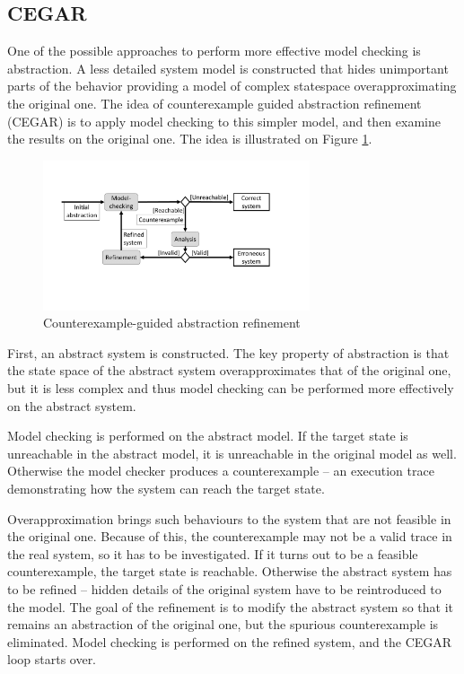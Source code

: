 \subsection{CEGAR}

One of the possible approaches to perform more effective model checking is abstraction. A less detailed system model is constructed that hides unimportant parts of the behavior providing a model of complex statespace overapproximating the original one. The idea of counterexample guided abstraction refinement (CEGAR) \cite{clarke2003counterexample} is to apply 
model checking to this simpler model, and then examine the results on the original one. The idea is illustrated on
Figure \ref{fig:cegar}.


\begin{figure}
	\centering
	\includegraphics [width=0.7\textwidth] {include/figures/cegar_flow_black}
	\caption{Counterexample-guided abstraction refinement}
	\label{fig:cegar}
\end{figure}


First, an abstract system is constructed. The key property of abstraction is
that the state space of the abstract system overapproximates that of the original
one, but it is less complex and thus model checking can be performed more effectively on the abstract system.

Model checking is performed on the abstract model. If the target state is
unreachable in the abstract model, it is unreachable in the original model
as well. Otherwise the model checker produces a counterexample -- an execution trace demonstrating how the
system can reach the target state. 

Overapproximation brings such behaviours to the system that are not feasible in the original one. Because of this, the counterexample may not be a valid trace in the real system, so it has to be investigated.
If it turns out to be a feasible counterexample, the target state is reachable. Otherwise
the abstract system has to be refined -- hidden details of the original system have to be reintroduced to the model. The goal of the refinement is to modify the abstract
system so that it remains an abstraction of the original one, but the spurious
counterexample is eliminated.  Model checking is performed on the
refined system, and the CEGAR loop starts over. 


